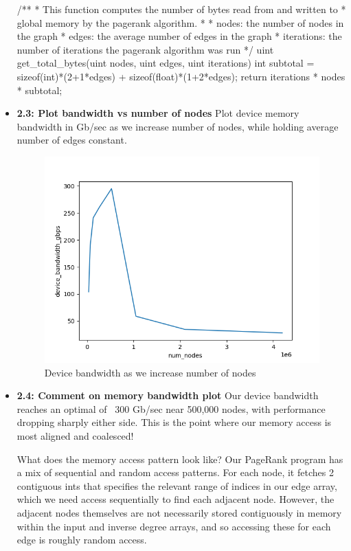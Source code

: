 \documentclass[12pt,letterpaper,twoside]{article}
\begin{document}
\begin{itemize}
\begin{cpp}
/**
* This function computes the number of bytes read from and written to
* global memory by the pagerank algorithm.
* 
* nodes: the number of nodes in the graph
* edges: the average number of edges in the graph
* iterations: the number of iterations the pagerank algorithm was run
*/
uint get_total_bytes(uint nodes, uint edges, uint iterations)
{
    int subtotal = sizeof(int)*(2+1*edges) + sizeof(float)*(1+2*edges);
    return iterations * nodes * subtotal;
}
\end{cpp}

    \item \textbf{2.3: Plot bandwidth vs number of nodes} Plot device
    memory bandwidth in Gb/sec as we increase number of nodes, while holding
    average number of edges constant.

    \begin{figure}[h]
        \center
        \includegraphics[scale=0.7]{q2_2.png}
        \caption{Device bandwidth as we increase number of nodes}
    \end{figure}

    \item \textbf{2.4: Comment on memory bandwidth plot} Our device bandwidth 
    reaches an optimal of ~300 Gb/sec near 500,000 nodes, with performance 
    dropping sharply either side. This is the point where our memory access
    is most aligned and coalesced!
    
    What does the memory access pattern look like? Our PageRank program has 
    a mix of sequential and random access patterns. For each node, it fetches
    2 contiguous ints that specifies the relevant range of indices in our 
    edge array, which we need access sequentially to find each adjacent node.
    However, the adjacent nodes themselves are not necessarily stored 
    contiguously in memory within the input and inverse degree arrays, 
    and so accessing these for each edge is roughly random access.


\end{itemize}
\end{document}
